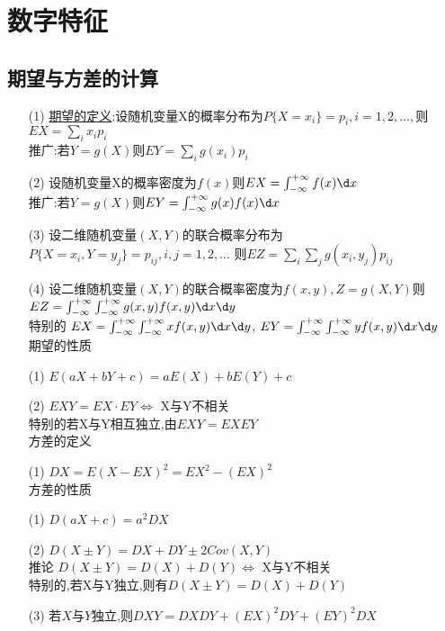 \documentclass[12pt, a4paper, oneside, UTF8]{ctexbook}
\begin{document}
% 
\else
\fi

\chapter{数字特征}

\section{期望与方差的计算}
\begin{remark}[期望与方差]
    \begin{enumerate}
    \item[(1)] \underline{期望的定义}:设随机变量X的概率分布为$P\{X=x_i\}=p_i,i=1,2,\ldots,$则$EX=\sum_{i}x_ip_i$ \\
    推广:若$Y=g(X)$则$EY=\sum_{i}g(x_i)p_i$ 
    \item[(2)]设随机变量X的概率密度为$f(x)$则$EX=\int_{-\infty}^{+\infty}f(x)\d x$ \\
    推广:若$Y=g(X)$则$EY=\int_{-\infty}^{+\infty}g(x)f(x)\d x$
    \item[(3)]设二维随机变量$(X,Y)$的联合概率分布为$P\{X=x_i,Y=y_j\}=p_{ij},i,j=1,2,\ldots$
    则$EZ=\sum_{i}\sum_{j}g(x_i,y_j)p_{ij}$
    \item[(4)]设二维随机变量$(X,Y)$的联合概率密度为$f(x,y),Z=g(X,Y)$则 \\
    $EZ=\int_{-\infty}^{+\infty}\int_{-\infty}^{+\infty}g(x,y)f(x,y)\d x\d y$ \\
    特别的 $EX=\int_{-\infty}^{+\infty}\int_{-\infty}^{+\infty}xf(x,y)\d x \d y$, 
    $EY=\int_{-\infty}^{+\infty}\int_{-\infty}^{+\infty}yf(x,y)\d x\d y$ \\
    期望的性质
    \item[(1)] $E(aX+bY+c)=aE(X)+bE(Y)+c$ 
    \item[(2)] $EXY=EX\cdot EY \iff $ X与Y不相关 \\
    特别的若X与Y相互独立,由$EXY=EXEY$ \\
    方差的定义
    \item[(1)] $DX=E(X-EX)^2=EX^2-(EX)^2$ \\
    方差的性质
    \item[(1)] $D(aX+c)=a^2DX$ 
    \item[(2)] $D(X\pm Y)=DX+DY\pm 2Cov(X,Y)$ \\
    推论 $D(X\pm Y)=D(X)+D(Y)\iff$ X与Y不相关 \\
    特别的,若X与Y独立,则有$D(X\pm Y)=D(X)+D(Y)$
    \item[(3)]若$X$与$Y$独立,则$DXY=DXDY+(EX)^2DY+(EY)^2DX$
    \end{enumerate}
\end{remark}
\end{document}
